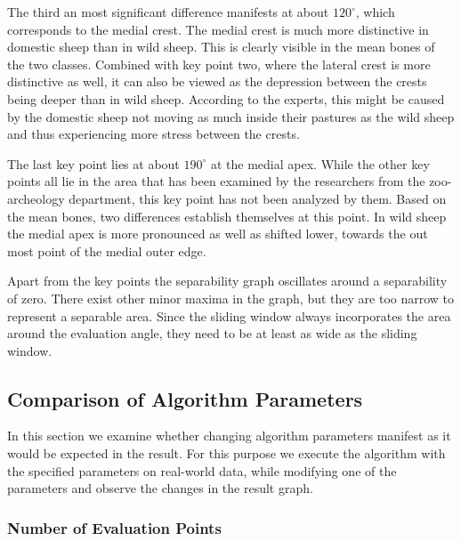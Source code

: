 \documentclass[pdftex,12pt,a4paper]{report}
\begin{document}
The third an most significant difference manifests at about $120^\circ$, which corresponds to the medial crest. The medial crest is much more distinctive in domestic sheep than in wild sheep. This is clearly visible in the mean bones of the two classes. Combined with key point two, where the lateral crest is more distinctive as well, it can also be viewed as the depression between the crests being deeper than in wild sheep. According to the experts, this might be caused by the domestic sheep not moving as much inside their pastures as the wild sheep and thus experiencing more stress between the crests.

The last key point lies at about $190^\circ$ at the medial apex. While the other key points all lie in the area that has been examined by the researchers from the zoo-archeology department, this key point has not been analyzed by them. Based on the mean bones, two differences establish themselves at this point. In wild sheep the medial apex is more pronounced as well as shifted lower, towards the out most point of the medial outer edge. 

Apart from the key points the separability graph oscillates around a separability of zero. There exist other minor maxima in the graph, but they are too narrow to represent a separable area. Since the sliding window always incorporates the area around the evaluation angle, they need to be at least as wide as the sliding window.



\subsection{Comparison of Algorithm Parameters}
\label{sub:comparisonalgorithmparameters}

In this section we examine whether changing algorithm parameters manifest as it would be expected in the result. For this purpose we execute the algorithm with the specified parameters on real-world data, while modifying one of the parameters and observe the changes in the result graph.

\subsubsection{Number of Evaluation Points}
\end{document}
